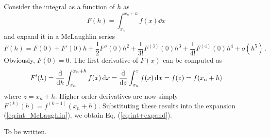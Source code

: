 \label{ap:int_expand}

\medskip\noindent
Consider the integral as a function of $h$ as
\begin{equation}
F(h) = \int_{x_n}^{x_n+h} f(x) \dd{x}
\end{equation}
and expand it in a McLaughlin series
\begin{equation}\label{eq:int_McLaughlin}
F(h) = F(0) + F'(0) h + \frac{1}{2} F''(0) h^2 + \frac{1}{3!} F^{(3)}(0) h^3 + \frac{1}{4!} F^{(4)}(0) h^4 + o(h^5)\, .
\end{equation}
Obviously, $F(0)=0$. The first derivative of $F(x)$ can be computed as
\begin{equation}
F'(h) = \dv{h} \int_{x_n}^{x_n+h} f(x) \dd{x} =  \dv{z} \int_{x_n}^{z} f(x) \dd{x} = f(z)=f(x_n+h)
\end{equation}
where $z=x_n+h$.  Higher order derivatives are now simply $F^{(k)}(h)=f^{(k-1)}(x_n+h)$. Substituting these results into the expansion (\ref{eq:int_McLaughlin}), we obtain Eq, (\ref{eq:int+expand}).

\bigskip

\label{app:gauss-quad}

To be written.


\newpage
{}

\renewcommand{\arraystretch}{1.5}

